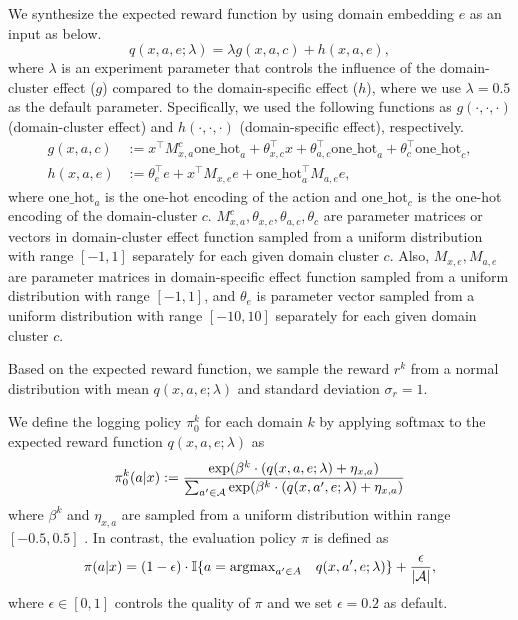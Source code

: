 We synthesize the expected reward function by using domain embedding $e$ as an input as below. 
\begin{equation}
    \label{reward function in syns}
    q(x,a,e; \lambda) = \lambda g(x,a,c) + h(x,a,e),
\end{equation}
where $\lambda$ is an experiment parameter that controls the influence of the domain-cluster effect ($g$) compared to the domain-specific effect ($h$), where we use $\lambda = 0.5$ as the default parameter. Specifically, we used the following functions as $g(\cdot, \cdot, \cdot)$ (domain-cluster effect) and $h(\cdot,\cdot,\cdot)$ (domain-specific effect), respectively.
\begin{align*}
g(x,a,c)&:=x^{\top}M^{c}_{x,a}\mathrm{one\_hot}_{a}+\theta_{x,c}^{\top}x+\theta_{a,c}^{\top}\mathrm{one\_hot}_{a}+\theta_{c}^{\top}\mathrm{one\_hot}_{c},\\
h(x,a,e)&:=\theta_e^{\top}e+x^{\top}M_{x,e}e+\mathrm{one\_hot}_{a}^{\top}M_{a,e}e,
\end{align*}
where $\mathrm{one\_hot}_{a}$ is the one-hot encoding of the action and $\mathrm{one\_hot}_{c}$ is the one-hot encoding of the domain-cluster $c$. $M^{c}_{x, a}, \theta_{x,c}, \theta_{a,c}, \theta_{c}$ are parameter matrices or vectors in domain-cluster effect function sampled from a uniform distribution with range $[-1,1]$ separately for each given domain cluster $c$. Also, $ M_{x,e}, M_{a,e}$ are parameter matrices in domain-specific effect function sampled from a uniform distribution with range $[-1,1]$, and $\theta_e$ is parameter vector sampled from a uniform distribution with range $[-10,10]$ separately for each given domain cluster $c$.

Based on the expected reward function, we sample the reward $r^{k}$ from a normal distribution with mean $q(x, a,e; \lambda)$ and standard deviation $\sigma_r = 1$. 

We define the logging policy $\pi_0^{k}$ for each domain $k$ by applying softmax to the expected reward function $q(x,a,e; \lambda)$ as
\begin{equation}
    \label{logging policy in syns}
    \pi_0^{k}(a|x):=\frac{\mathrm{exp}(\beta^k\cdot (q(x,a,e; \lambda)+\eta_{x,a})}{\sum_{a'\in \mathcal{A}}\mathrm{exp}(\beta^k\cdot (q(x,a',e; \lambda)+\eta_{x,a})}
\end{equation}
where $\beta^{k}$ and $\eta_{x,a}$ are sampled from a uniform distribution within range $[-0.5,0.5]$ . 
In contrast, the evaluation policy $\pi$ is defined as
\begin{align}
    \pi(a|x)= (1-\epsilon) \cdot \mathbb{I} \{ a= \mathrm{argmax}_{a'\in A} \quad q(x,a',e; \lambda)\}+\frac{\epsilon}{|\mathcal{A}|}, 
\end{align}
where $\epsilon \in [0, 1]$ controls the quality of $\pi$ and we set $\epsilon = 0.2$ as default.


